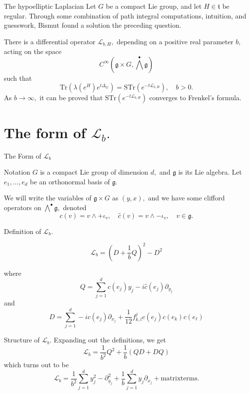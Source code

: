 \documentclass{beamer}
\numberwithin{equation}{section}
\theoremstyle{plain}
\theoremstyle{plain}
\theoremstyle{definition}
\theoremstyle{plain}
\theoremstyle{plain}
\theoremstyle{definition}
\newcommand{\Lc}{\mathcal{L}}
\newcommand{\Tr}{\mathrm{Tr}}
\newcommand{\gf}{\mathfrak{g}}
\newcommand{\tf}{\mathfrak{t}}
\newcommand{\Str}{\mathrm{STr}}
\begin{document}
\begin{frame}{The hypoelliptic Laplacian}
  Let $G$ be a compact Lie group, and let $H\in \tf$ be regular. Through some combination of path integral computations, intuition, and guesswork, Bismut found a solution the preceding question.
  \begin{theorem}
    There is a differential operator $\Lc_{b,H},$ depending on a positive real parameter $b,$ acting on the space
    \[
      C^\infty(\gf\times G,\bigwedge^{\bullet}\gf)
    \]
    such that
    \[
       \Tr(\lambda(e^H)e^{t\Delta_G}) = \Str(e^{-t\Lc_{b,H}}),\quad b>0.
    \]
    As $b\to\infty,$ it can be proved that $\Str(e^{-t\Lc_{b,H}})$ converges to Frenkel's formula.
  \end{theorem}
\end{frame}

\section{The form of $\Lc_b.$}

\begin{frame}
  \huge{The Form of $\Lc_b$}
\end{frame}

\begin{frame}{Notation}
  $G$ is a compact Lie group of dimension $d,$ and $\gf$ is its Lie algebra. Let $e_1,\ldots,e_d$ be an orthonormal basis of $\gf.$
  
  We will write the variables of $\gf\times G$ as $(y,x),$ and we have some clifford operators on $\bigwedge^{\bullet}\gf,$ denoted
  \[
    c(v) = v\wedge + \iota_v,\quad \widehat{c}(v) = v\wedge -\iota_v,\quad v \in \gf.
  \]
\end{frame}

\begin{frame}{Definition of $\Lc_b.$}
  \begin{definition}
    \[
      \Lc_b = (D+\frac1bQ)^2-D^2
    \]
  \end{definition}
  where
  \[
    Q = \sum_{j=1}^d c(e_j)y_j-i\widehat{c}(e_j)\partial_{y_j}
  \]
  and 
  \[
    D = \sum_{j=1}^d -ic(e_j)\partial_{x_j}+\frac{1}{12}f^j_{k,l}c(e_j)c(e_k)c(e_\ell)
  \]
\end{frame}

\begin{frame}{Structure of $\Lc_b.$}
  Expanding out the definitions, we get
  \[
    \Lc_b = \frac{1}{b^2}Q^2+\frac{1}{b}(QD+DQ)
  \]
  which turns out to be
  \[
    \Lc_b = \frac{1}{b^2}\sum_{j=1}^d y_j^2-\partial_{y_j}^2 + \frac{1}{b}\sum_{j=1}^dy_j\partial_{x_j} + \mathrm{matrix terms.}
  \]
\end{frame}
\end{document}
